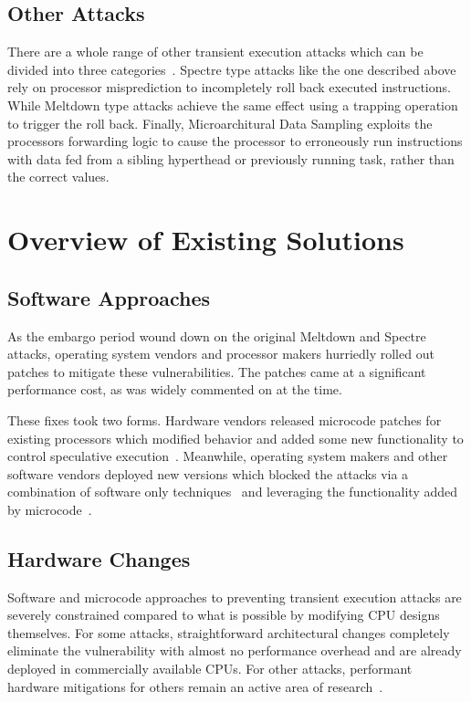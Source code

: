 \subsection*{Other Attacks}
There are a whole range of other transient execution attacks which can be divided into three categories~\cite{hill:survey}.
Spectre type attacks like the one described above rely on processor misprediction to incompletely roll back executed instructions.
While Meltdown type attacks achieve the same effect using a trapping operation to trigger the roll back.
Finally, Microarchitural Data Sampling exploits the processors forwarding logic to cause the processor to erroneously run instructions with data fed from a sibling hyperthead or previously running task, rather than the correct values.

\section*{Overview of Existing Solutions}
\subsection*{Software Approaches}
As the embargo period wound down on the original Meltdown and Spectre attacks, operating system vendors and processor makers hurriedly rolled out patches to mitigate these vulnerabilities.
The patches came at a significant performance cost, as was widely commented on at the time. 

These fixes took two forms.
Hardware vendors released microcode patches for existing processors which modified behavior and added some new functionality to control speculative execution~\cite{intel:l1tf}.
Meanwhile, operating system makers and other software vendors deployed new versions which blocked the attacks via a combination of software only techniques~\cite{intel:retpoline, linux:kpti} and leveraging the functionality added by microcode~\cite{intel:l1tf}.

\subsection*{Hardware Changes}
Software and microcode approaches to preventing transient execution attacks are severely constrained compared to what is possible by modifying CPU designs themselves.
For some attacks, straightforward architectural changes completely eliminate the vulnerability with almost no performance overhead and are already deployed in commercially available CPUs.
For other attacks, performant hardware mitigations for others remain an active area of research~\cite{OISA, ConTExT}.

